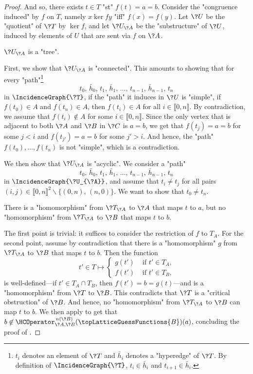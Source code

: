 \begin{proof}
	And so, there exists $t \in T$ "st" $f(t) = a = b$.
	Consider the "congruence induced" by $f$ on $T$, namely $x \ker{f} y$ "iff"
	$f(x) = f(y)$. Let $\?U$ be the "quotient" of $\?T$ by $\ker{f}$,
	and let $\?U_{\?A}$ be the "substructure" of $\?U$, induced by elements
	of $U$ that are sent via $f$ on $\?A$.
	\begin{claim}
		\AP\label{claim:hyperedge-consistency-uniform-convergence-trees-are-trees}
		$\?U_{\?A}$ is a "tree".
	\end{claim}
	First, we show that $\?U_{\?A}$ is "connected". This amounts to showing that for
	every "path"\footnote{$t_i$ denotes an element of $\?T$ and $\bar h_i$ denotes a "hyperedge" of $\?T$. By definition of $\IncidenceGraph{\?T}$, $t_i \in \bar h_i$ and
	$t_{i+1} \in \bar h_i$.}
	\[
		t_0,\, \bar h_0,\, t_1,\, \bar h_1,\, \hdots,\, t_{n-1},\, \bar h_{n-1},\, t_n
	\]
	in $\IncidenceGraph{\?T}$, if the "path" it induces in $\?U$ is "simple",
	if $f(t_0) \in A$ and $f(t_n) \in A$,
	then $f(t_i) \in A$ for all $i \in \lBrack 0,n \rBrack$.
	By contradiction, we assume that $f(t_i) \not\in A$ for some $i \in \lBrack 0,n \rBrack$.
	Since the only vertex that is adjacent to both $\?A$ and $\?B$ in $\?C$ is $a=b$,
	we get that $f(t_j) = a = b$ for some $j < i$ and $f(t_{j'}) = a = b$ for some $j' > i$.
	And hence, the "path" $f(t_0), \hdots, f(t_n)$ is not "simple", which is a contradiction.

	We then show that $\?U_{\?A}$ is "acyclic". We consider a "path"
	\[
		t_0,\, \bar h_0,\, t_1,\, \bar h_1,\, \hdots,\, t_{n-1},\, \bar h_{n-1},\, t_n
	\]
	in $\IncidenceGraph{\?U_{\?A}}$, and assume that $t_i \neq t_j$ for all pairs
	$(i,j) \in \lBrack 0,n\rBrack^2 \smallsetminus \{(0,n),\, (n,0)\}$.
	We want to show that $t_0 \neq t_n$.
		

	\begin{claim}
		\AP\label{claim:hyperedge-consistency-uniform-convergence-tree}
		There is a "homomorphism" from $\?T_{\?A}$ to $\?A$ that maps $t$ to $a$,
		but no "homomorphism" from $\?T_{\?A}$ to $\?B$ that maps $t$ to $b$.
	\end{claim}
	The first point is trivial: it suffices to consider the restriction of $f$ to $T_A$.
	For the second point, assume by contradiction that there is a "homomorphism" $g$ from
	$\?T_{\?A}$ to $\?B$ that maps $t$ to $b$.
	Then the function
	\[
		t' \in T \mapsto \begin{cases*}
			g(t') & \text{ if $t' \in T_A$,}\\
			f(t') & \text{ if $t' \in T_B$,}
		\end{cases*}
	\]
	is well-defined---if $t' \in T_A \cap T_B$, then $f(t') = b = g(t)$---and is a "homomorphism"
	from $\?T$ to $\?B$. This contradicts that $\?T$ is a "critical obstruction" of $\?B$.
	And hence, no "homomorphism" from $\?T_{\?A}$ to $\?B$ can map $t$ to $b$.
	We then apply 
	to get that $b \not\in \HCOperator^{\,n(\?B)}_{\?A,\?B}(\topLatticeGuessFunctions{B})(a)$,
	concluding the proof of .
	

\end{proof}
